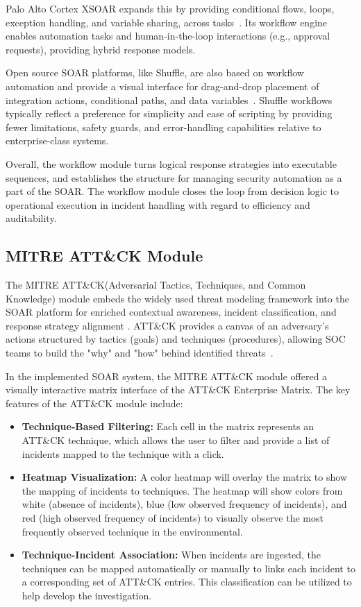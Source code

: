 Palo Alto Cortex XSOAR expands this by providing conditional flows, loops, exception handling, and variable sharing, across tasks~\cite{paloalto}. Its workflow engine enables automation tasks and human-in-the-loop interactions (e.g., approval requests), providing hybrid response models.

Open source SOAR platforms, like Shuffle, are also based on workflow automation and provide a visual interface for drag-and-drop placement of integration actions, conditional paths, and data variables~\cite{techtarget}. Shuffle workflows typically reflect a preference for simplicity and ease of scripting by providing fewer limitations, safety guards, and error-handling capabilities relative to enterprise-class systems.

Overall, the workflow module turns logical response strategies into executable sequences, and establishes the structure for managing security automation as a part of the SOAR. The workflow module closes the loop from decision logic to operational execution in incident handling with regard to efficiency and auditability.

\subsection{MITRE ATT\&CK Module}

The MITRE ATT\&CK(Adversarial Tactics, Techniques, and Common Knowledge) module embeds the widely used threat modeling framework into the SOAR platform for enriched contextual awareness, incident classification, and response strategy alignment . ATT\&CK provides a canvas of an adversary's actions structured by tactics (goals) and techniques (procedures), allowing SOC teams to build the "why" and "how" behind identified threats~\cite{mitre}.

In the implemented SOAR system, the MITRE ATT\&CK module offered a visually interactive matrix interface of the ATT\&CK Enterprise Matrix. The key features of the ATT\&CK module include:

\begin{itemize}
    \item \textbf{Technique-Based Filtering:} Each cell in the matrix represents an ATT\&CK technique, which allows the user to filter and provide a list of incidents mapped to the technique with a click.
    
    \item \textbf{Heatmap Visualization:} A color heatmap will overlay the matrix to show the mapping of incidents to techniques. The heatmap will show colors from white (absence of incidents), blue (low observed frequency of incidents), and red (high observed frequency of incidents) to visually observe the most frequently observed technique in the environmental.
    
    \item \textbf{Technique-Incident Association:} When incidents are ingested, the techniques can be mapped automatically or manually to links each incident to a corresponding set of ATT\&CK entries. This classification can be utilized to help develop the investigation.
\end{itemize}


